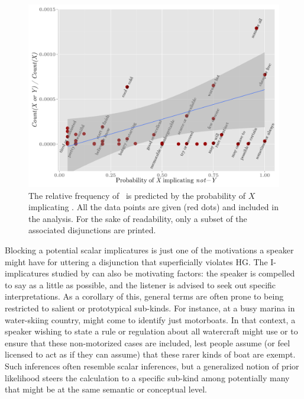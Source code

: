 \documentclass[12pt,twoside]{article}
\renewcommand{\_}{\textbf{\textunderscore\hspace{-4pt}\textunderscore\hspace{-3pt}\textunderscore\hspace{-4pt}\textunderscore}\hspace{0.5pt}}			%
\begin{document}
\begin{figure}[tp]
  \centering
  \includegraphics[width=1\textwidth]{fig/disjunction-and-implicature}
  \caption{The relative frequency of \XorY\ is predicted by the
    probability of $X$ implicating .  All the data points
    are given (red dots) and included in the analysis. For the sake of
    readability, only a subset of the associated disjunctions are
    printed.}
  \label{fig:chemla}
\end{figure}

Blocking a potential scalar implicatures is just one of the
motivations a speaker might have for uttering a disjunction that
superficially violates HG. The I-implicatures studied by
\citet{Levinson00} can also be motivating factors: the speaker is
compelled to say as a little as possible, and the listener is advised
to seek out specific interpretations. As a corollary of this, general
terms are often prone to being restricted to salient or prototypical
sub-kinds. For instance, at a busy marina in water-skiing country,
 might come to identify just motorboats. In that context, a
speaker wishing to state a rule or regulation about all watercraft
might use  or  to ensure that
these non-motorized cases are included, lest people assume (or feel
licensed to act as if they can assume) that these rarer kinds of boat
are exempt. Such inferences often resemble scalar inferences, but a
generalized notion of prior likelihood steers the calculation to a
specific sub-kind among potentially many that might be at the same
semantic or conceptual level.
\end{document}
